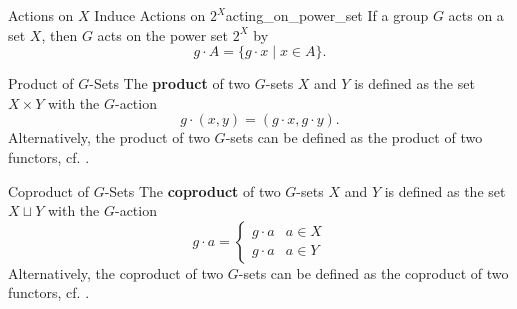 \begin{example}{Actions on $X$ Induce Actions on $2^X$}{acting_on_power_set}
    If a group $G$ acts on a set $X$, then $G$ acts on the power set $2^X$ by
    \[
        g\cdot A=\{ g\cdot x\mid x\in A\}    .
    \]
\end{example}


\begin{definition}{Product of $G$-Sets}{}
    The \textbf{product} of two $G$-sets $X$ and $Y$ is defined as the set $X\times Y$ with the $G$-action
    \[
        g\cdot (x,y)=(g\cdot x, g\cdot y)    .
    \]
    Alternatively, the product of two $G$-sets can be defined as the product of two functors, cf. .
\end{definition}

\begin{definition}{Coproduct of $G$-Sets}{}
    The \textbf{coproduct} of two $G$-sets $X$ and $Y$ is defined as the set $X\sqcup Y$ with the $G$-action
    \[
        g\cdot a=\begin{cases}
            g\cdot a & a\in X \\
            g\cdot a & a\in Y
        \end{cases}
    \]
    Alternatively, the coproduct of two $G$-sets can be defined as the coproduct of two functors, cf. .
\end{definition}

